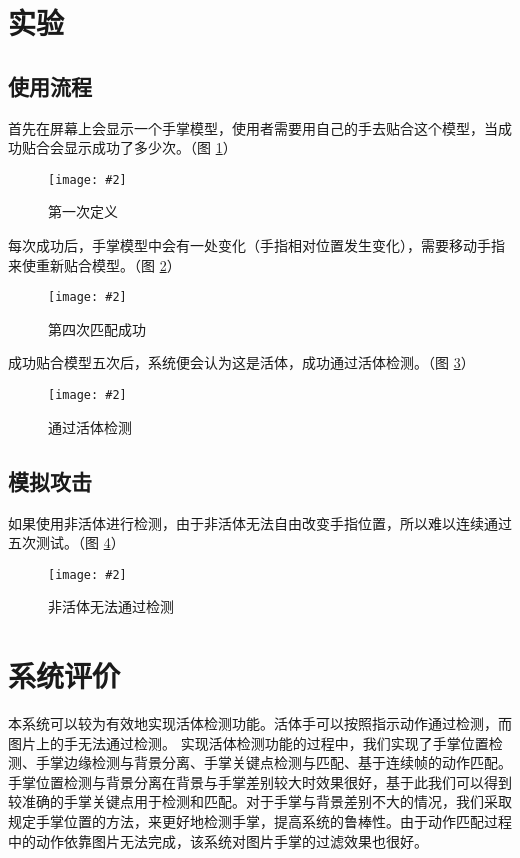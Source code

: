 \documentclass[a4paper, fontset=none]{article}
\newcommand{\img}[2]{\begin{center}\texttt{[image: \#2]}\end{center}}
\begin{document}
\section{实验}

    \subsection{使用流程}
	
	首先在屏幕上会显示一个手掌模型，使用者需要用自己的手去贴合这个模型，当成功贴合会显示成功了多少次。（图 \ref{match1}）
	
	\begin{figure}[H]
    \img{0.6}{./test1.png}
    \caption{第一次定义}
    \label{match1}
	\end{figure}
	
	每次成功后，手掌模型中会有一处变化（手指相对位置发生变化），需要移动手指来使重新贴合模型。（图 \ref{match2}）
	
	\begin{figure}[H]
    \img{0.6}{./test2.png}
    \caption{第四次匹配成功}
    \label{match2}
	\end{figure}
	
	成功贴合模型五次后，系统便会认为这是活体，成功通过活体检测。（图 \ref{match3}）
	
	\begin{figure}[H]
    \img{0.6}{./finish.png}
    \caption{通过活体检测}
    \label{match3}
	\end{figure}

    \subsection{模拟攻击}
	
	如果使用非活体进行检测，由于非活体无法自由改变手指位置，所以难以连续通过五次测试。（图 \ref{match4}）
	
	\begin{figure}[H]
    \img{0.6}{./fault.jpg}
    \caption{非活体无法通过检测}
    \label{match4}
	\end{figure}

\section{系统评价}

本系统可以较为有效地实现活体检测功能。活体手可以按照指示动作通过检测，而图片上的手无法通过检测。
实现活体检测功能的过程中，我们实现了手掌位置检测、手掌边缘检测与背景分离、手掌关键点检测与匹配、基于连续帧的动作匹配。
手掌位置检测与背景分离在背景与手掌差别较大时效果很好，基于此我们可以得到较准确的手掌关键点用于检测和匹配。对于手掌与背景差别不大的情况，我们采取规定手掌位置的方法，来更好地检测手掌，提高系统的鲁棒性。由于动作匹配过程中的动作依靠图片无法完成，该系统对图片手掌的过滤效果也很好。
\end{document}
